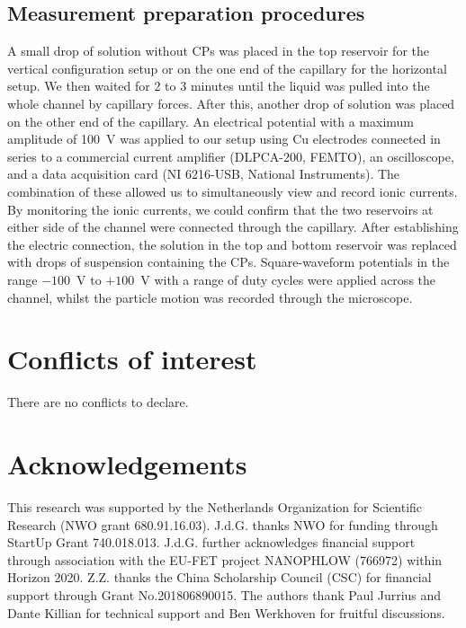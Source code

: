 \documentclass[twoside,twocolumn,9pt]{article}
\renewcommand{\refname}{Notes and references}
\begin{document}
\subsection*{Measurement preparation procedures}

A small drop of solution without CPs was placed in the top reservoir for the vertical configuration setup or on the one end of the capillary for the horizontal setup. We then waited for 2 to 3 minutes until the liquid was pulled into the whole channel by capillary forces. After this, another drop of solution was placed on the other end of the capillary. An electrical potential with a maximum amplitude of 100~V was applied to our setup using Cu electrodes connected in series to a commercial current amplifier (DLPCA-200, FEMTO), an oscilloscope, and a data acquisition card (NI 6216-USB, National Instruments). The combination of these allowed us to simultaneously view and record ionic currents. By monitoring the ionic currents, we could confirm that the two reservoirs at either side of the channel were connected through the capillary. After establishing the electric connection, the solution in the top and bottom reservoir was replaced with drops of suspension containing the CPs. Square-waveform potentials in the range $-100$~V to $+100$~V with a range of duty cycles were applied across the channel, whilst the particle motion was recorded through the microscope.

\section*{Conflicts of interest}

There are no conflicts to declare.

\section*{Acknowledgements}
This research was supported by the Netherlands Organization for Scientific Research (NWO grant 680.91.16.03). J.d.G. thanks NWO for funding through StartUp Grant 740.018.013. J.d.G. further acknowledges financial support through association with the EU-FET project NANOPHLOW (766972) within Horizon 2020. Z.Z. thanks the China Scholarship Council (CSC) for financial support through Grant No.201806890015. The authors thank Paul Jurrius and Dante Killian for technical support and Ben Werkhoven for fruitful discussions.



\balance


\end{document}
